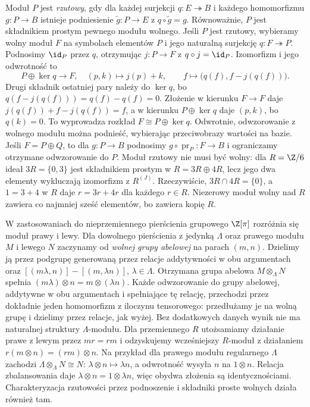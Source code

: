 \begin{uwaga}
\label{uwaga:moduly-projektywne}
Moduł $P$ jest \emph{rzutowy}, gdy dla każdej
surjekcji $q:E\twoheadrightarrow B$ i każdego
homomorfizmu $g:P\to B$ istnieje podniesienie
$\widetilde g:P\to E$ z $q\circ\widetilde g=g$.
Równoważnie, $P$ jest składnikiem prostym
pewnego modułu wolnego. Jeśli $P$ jest rzutowy,
wybieramy wolny moduł $F$ na symbolach elementów
$P$ i jego naturalną surjekcję $q:F\twoheadrightarrow P$.
Podnosimy $\id_P$ przez $q$, otrzymując $j:P\to F$
z $q\circ j=\id_P$. Izomorfizm i jego odwrotność to
\[
 P\oplus\ker q\longrightarrow F,\quad (p,k)\longmapsto j(p)+k,
 \qquad
 f\longmapsto\bigl(q(f),f-j(q(f))\bigr).
\]
Drugi składnik ostatniej pary należy do $\ker q$, bo
$q(f-j(q(f)))=q(f)-q(f)=0$.
Złożenie w kierunku $F\to F$ daje $j(q(f))+f-j(q(f))=f$,
a w kierunku $P\oplus\ker q$ daje $(p,k)$, bo $q(k)=0$.
To wyprowadza rozkład $F\cong P\oplus\ker q$. Odwrotnie,
odwzorowanie z wolnego modułu można podnieść,
wybierając przeciwobrazy wartości na bazie.
Jeśli $F=P\oplus Q$, to dla $g:P\to B$
podnosimy $g\circ\operatorname{pr}_P:F\to B$
i ograniczamy otrzymane odwzorowanie do $P$.
Moduł rzutowy nie musi być wolny: dla
$R=\Z/6$ ideał $3R=\{0,3\}$ jest składnikiem
prostym w $R=3R\oplus4R$, lecz jego dwa
elementy wykluczają izomorfizm z $R^{(J)}$.
Rzeczywiście, $3R\cap4R=\{0\}$, a $1=3+4$ w $R$ daje
$r=3r+4r$ dla każdego $r\in R$. Niezerowy moduł wolny
nad $R$ zawiera co najmniej sześć elementów, bo zawiera kopię $R$.
\end{uwaga}

W zastosowaniach do nieprzemiennego pierścienia
grupowego $\Z[\pi]$ rozróżnia się moduł prawy
i lewy. Dla dowolnego pierścienia z jedynką $\Lambda$
oraz prawego modułu $M$ i lewego $N$ zaczynamy od
\emph{wolnej grupy abelowej} na parach $(m,n)$.
Dzielimy ją przez podgrupę generowaną przez relacje
addytywności w obu argumentach oraz
$[(m\lambda,n)]-[(m,\lambda n)]$, $\lambda\in\Lambda$.
Otrzymana grupa abelowa $M\otimes_\Lambda N$ spełnia
$(m\lambda)\otimes n=m\otimes(\lambda n)$.
Każde odwzorowanie do grupy abelowej, addytywne w obu
argumentach i spełniające tę relację, przechodzi przez
dokładnie jeden homomorfizm z iloczynu tensorowego: przedłużamy je
na wolną grupę i dzielimy przez relacje, jak wyżej.
Bez dodatkowych danych wynik nie ma naturalnej struktury
$\Lambda$-modułu. Dla przemiennego $R$ utożsamiamy działanie
prawe z lewym przez $mr=rm$ i odzyskujemy wcześniejszy
$R$-moduł z działaniem $r(m\otimes n)=(rm)\otimes n$.
Na przykład dla prawego modułu regularnego $\Lambda$ zachodzi
$\Lambda\otimes_\Lambda N\cong N$:
$\lambda\otimes n\mapsto\lambda n$, a odwrotność
wysyła $n$ na $1\otimes n$. Relacja zbalansowania daje
$\lambda\otimes n=1\otimes\lambda n$, więc obydwa
złożenia są identycznościami.
Charakteryzacja rzutowości przez podnoszenie i
składniki proste wolnych działa również tam.

